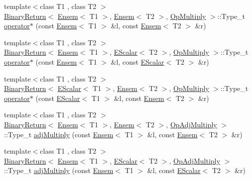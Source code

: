 \begin{DoxyCompactItemize}
\item 
{\footnotesize template$<$class T1 , class T2 $>$ }\\\mbox{\hyperlink{structENSEM_1_1BinaryReturn}{Binary\+Return}}$<$ \mbox{\hyperlink{classENSEM_1_1Ensem}{Ensem}}$<$ T1 $>$, \mbox{\hyperlink{classENSEM_1_1Ensem}{Ensem}}$<$ T2 $>$, \mbox{\hyperlink{structENSEM_1_1OpMultiply}{Op\+Multiply}} $>$\+::Type\+\_\+t \mbox{\hyperlink{group__eensem_gacf3333408054c89c251c9c44d25fa321}{operator$\ast$}} (const \mbox{\hyperlink{classENSEM_1_1Ensem}{Ensem}}$<$ T1 $>$ \&l, const \mbox{\hyperlink{classENSEM_1_1Ensem}{Ensem}}$<$ T2 $>$ \&r)
\item 
{\footnotesize template$<$class T1 , class T2 $>$ }\\\mbox{\hyperlink{structENSEM_1_1BinaryReturn}{Binary\+Return}}$<$ \mbox{\hyperlink{classENSEM_1_1Ensem}{Ensem}}$<$ T1 $>$, \mbox{\hyperlink{classENSEM_1_1EScalar}{E\+Scalar}}$<$ T2 $>$, \mbox{\hyperlink{structENSEM_1_1OpMultiply}{Op\+Multiply}} $>$\+::Type\+\_\+t \mbox{\hyperlink{group__eensem_gad8e9dadde3e0114542b222f4631cc216}{operator$\ast$}} (const \mbox{\hyperlink{classENSEM_1_1Ensem}{Ensem}}$<$ T1 $>$ \&l, const \mbox{\hyperlink{classENSEM_1_1EScalar}{E\+Scalar}}$<$ T2 $>$ \&r)
\item 
{\footnotesize template$<$class T1 , class T2 $>$ }\\\mbox{\hyperlink{structENSEM_1_1BinaryReturn}{Binary\+Return}}$<$ \mbox{\hyperlink{classENSEM_1_1EScalar}{E\+Scalar}}$<$ T1 $>$, \mbox{\hyperlink{classENSEM_1_1Ensem}{Ensem}}$<$ T2 $>$, \mbox{\hyperlink{structENSEM_1_1OpMultiply}{Op\+Multiply}} $>$\+::Type\+\_\+t \mbox{\hyperlink{group__eensem_ga56ee052eb9134728080172ffe2e946af}{operator$\ast$}} (const \mbox{\hyperlink{classENSEM_1_1EScalar}{E\+Scalar}}$<$ T1 $>$ \&l, const \mbox{\hyperlink{classENSEM_1_1Ensem}{Ensem}}$<$ T2 $>$ \&r)
\item 
{\footnotesize template$<$class T1 , class T2 $>$ }\\\mbox{\hyperlink{structENSEM_1_1BinaryReturn}{Binary\+Return}}$<$ \mbox{\hyperlink{classENSEM_1_1Ensem}{Ensem}}$<$ T1 $>$, \mbox{\hyperlink{classENSEM_1_1Ensem}{Ensem}}$<$ T2 $>$, \mbox{\hyperlink{structENSEM_1_1OpAdjMultiply}{Op\+Adj\+Multiply}} $>$\+::Type\+\_\+t \mbox{\hyperlink{group__eensem_ga5f37d8984a1db92adfb04f6c0908a563}{adj\+Multiply}} (const \mbox{\hyperlink{classENSEM_1_1Ensem}{Ensem}}$<$ T1 $>$ \&l, const \mbox{\hyperlink{classENSEM_1_1Ensem}{Ensem}}$<$ T2 $>$ \&r)
\item 
{\footnotesize template$<$class T1 , class T2 $>$ }\\\mbox{\hyperlink{structENSEM_1_1BinaryReturn}{Binary\+Return}}$<$ \mbox{\hyperlink{classENSEM_1_1Ensem}{Ensem}}$<$ T1 $>$, \mbox{\hyperlink{classENSEM_1_1EScalar}{E\+Scalar}}$<$ T2 $>$, \mbox{\hyperlink{structENSEM_1_1OpAdjMultiply}{Op\+Adj\+Multiply}} $>$\+::Type\+\_\+t \mbox{\hyperlink{group__eensem_ga357579ea9af81c46ec906486ce9f2a52}{adj\+Multiply}} (const \mbox{\hyperlink{classENSEM_1_1Ensem}{Ensem}}$<$ T1 $>$ \&l, const \mbox{\hyperlink{classENSEM_1_1EScalar}{E\+Scalar}}$<$ T2 $>$ \&r)

\end{DoxyCompactItemize}

